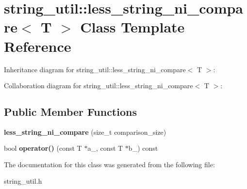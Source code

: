 \section{string\+\_\+util\+:\+:less\+\_\+string\+\_\+ni\+\_\+compare$<$ T $>$ Class Template Reference}
\label{classstring__util_1_1less__string__ni__compare}


Inheritance diagram for string\+\_\+util\+:\+:less\+\_\+string\+\_\+ni\+\_\+compare$<$ T $>$\+:


Collaboration diagram for string\+\_\+util\+:\+:less\+\_\+string\+\_\+ni\+\_\+compare$<$ T $>$\+:
\subsection*{Public Member Functions}
\begin{DoxyCompactItemize}
\item 
{\bfseries less\+\_\+string\+\_\+ni\+\_\+compare} (size\+\_\+t comparison\+\_\+size)\label{classstring__util_1_1less__string__ni__compare_aec49bc79089ab2e54ff4752bbbabe6bf}

\item 
bool {\bfseries operator()} (const T $\ast$a\+\_\+, const T $\ast$b\+\_\+) const \label{classstring__util_1_1less__string__ni__compare_a6050f7d7b4998343cc5c46dca8b28bcc}

\end{DoxyCompactItemize}


The documentation for this class was generated from the following file\+:\begin{DoxyCompactItemize}
\item 
string\+\_\+util.\+h\end{DoxyCompactItemize}
